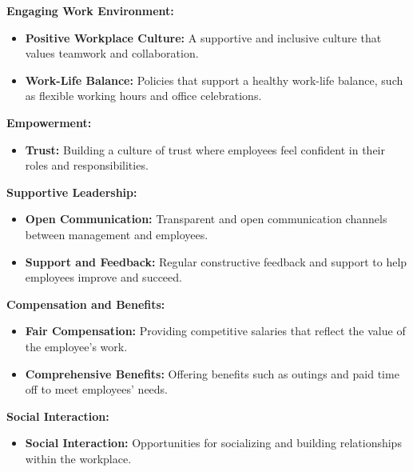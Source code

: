 

\item \textbf{Engaging Work Environment:}
\begin{itemize}
    \item \textbf{Positive Workplace Culture:} A supportive and inclusive culture that values teamwork and collaboration.
    \item \textbf{Work-Life Balance:} Policies that support a healthy work-life balance, such as flexible working hours and office celebrations.
\end{itemize}

\item \textbf{Empowerment:}
\begin{itemize}
    \item \textbf{Trust:} Building a culture of trust where employees feel confident in their roles and responsibilities.
\end{itemize}

\item \textbf{Supportive Leadership:}
\begin{itemize}
    \item \textbf{Open Communication:} Transparent and open communication channels between management and employees.
    \item \textbf{Support and Feedback:} Regular constructive feedback and support to help employees improve and succeed.
\end{itemize}

\item \textbf{Compensation and Benefits:}
\begin{itemize}
    \item \textbf{Fair Compensation:} Providing competitive salaries that reflect the value of the employee's work.
    \item \textbf{Comprehensive Benefits:} Offering benefits such as outings and paid time off to meet employees' needs.
\end{itemize}

\item \textbf{Social Interaction:}
\begin{itemize}
    \item \textbf{Social Interaction:} Opportunities for socializing and building relationships within the workplace.
\end{itemize}
